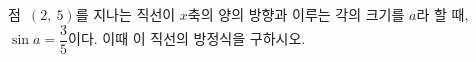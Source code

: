 점~$(2,\ 5)$를 지나는 직선이 $x$축의 양의 방향과 이루는 각의 크기를 $a$라 할 때, $\sin a=\dfrac{3}{5}$이다. 이때 이 직선의 방정식을 구하시오. 
